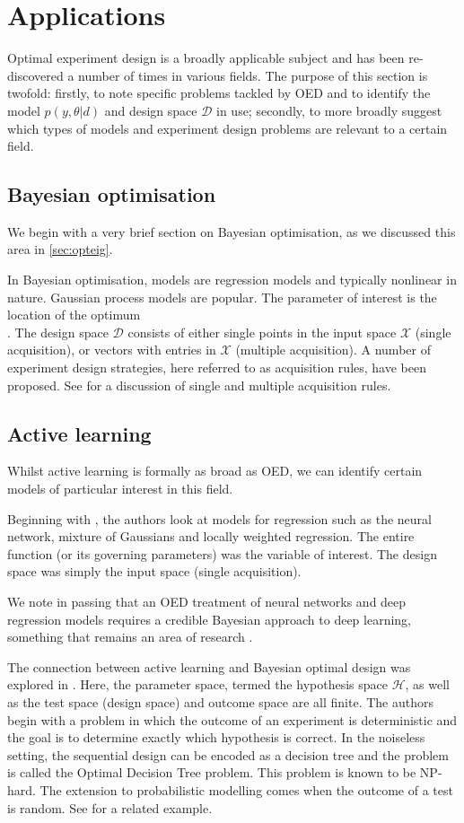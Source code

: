 \section{Applications}
Optimal experiment design is a broadly applicable subject and has been re-discovered a number of times in various fields. The purpose of this section is twofold: firstly, to note specific problems tackled by OED and to identify the model $p(y, \theta | d)$ and design space $\mathcal{D}$ in use; secondly, to more broadly suggest which types of models and experiment design problems are relevant to a certain field.

\subsection{Bayesian optimisation}
We begin with a very brief section on Bayesian optimisation, as we discussed this area in \ref{sec:opteig}.

In Bayesian optimisation, models are regression models and typically nonlinear in nature. Gaussian process models are popular. The parameter of interest is the location of the optimum \\ \cite{pes}. The design space $\mathcal{D}$ consists of either single points in the input space $\mathcal{X}$ (single acquisition), or vectors with entries in $\mathcal{X}$ (multiple acquisition). A number of experiment design strategies, here referred to as acquisition rules, have been proposed. See \cite{ginsbourger2008, azimi2012} for a discussion of single and multiple acquisition rules.

\subsection{Active learning}
Whilst active learning is formally as broad as OED, we can identify certain models of particular interest in this field.

Beginning with \cite{cohn1996}, the authors look at models for regression such as the neural network, mixture of Gaussians and locally weighted regression. The entire function (or its governing parameters) was the variable of interest. The design space was simply the input space (single acquisition).

We note in passing that an OED treatment of neural networks and deep regression models requires a credible Bayesian approach to deep learning, something that remains an area of research \cite{gal2016}.

The connection between active learning and Bayesian optimal design was explored in \cite{golovin2010}. Here, the parameter space, termed the hypothesis space $\mathcal{H}$, as well as the test space (design space) and outcome space are all finite. The authors begin with a problem in which the outcome of an experiment is deterministic and the goal is to determine exactly which hypothesis is correct. In the noiseless setting, the sequential design can be encoded as a decision tree and the problem is called the Optimal Decision Tree problem. This problem is known to be NP-hard. The extension to probabilistic modelling comes when the outcome of a test is random. See \cite{nowak2009} for a related example.

